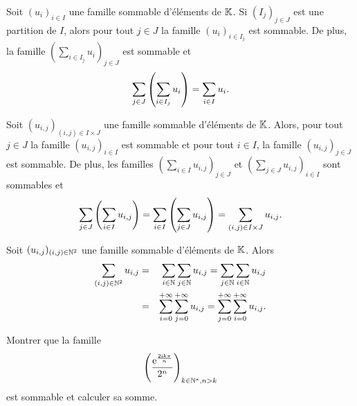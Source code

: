 \documentclass{magnolia}
\begin{document}
\begin{proposition}[nom={Théorème de sommation par paquets}]
Soit $(u_i)_{i\in I}$ une famille sommable d'éléments de $\mathbb{K}$. Si $(I_j)_{j\in J}$ est
une partition de $I$, alors pour tout $j\in J$ la famille $(u_i)_{i\in I_j}$ est
sommable. De plus, la famille $(\sum_{i\in I_j} u_i)_{j\in J}$ est sommable et
\[\sum_{j\in J} \left(\sum_{i\in I_j} u_i\right)=\sum_{i\in I} u_i.\]
\end{proposition}

\begin{proposition}[nom={Théorème de \nom{Fubini}}]
Soit $(u_{i,j})_{(i,j)\in I\times J}$ une famille sommable d'éléments de $\mathbb{K}$. Alors,
pour tout $j\in J$ la famille $(u_{i,j})_{i\in I}$ est sommable et pour tout $i\in I$,
la famille  $(u_{i,j})_{j\in J}$ est sommable. De plus, les
familles $(\sum_{i\in I} u_{i,j})_{j\in J}$ et $(\sum_{j\in J} u_{i,j})_{i\in I}$ sont
sommables et
\[\sum_{j\in J} \left(\sum_{i\in I} u_{i,j}\right)=
  \sum_{i\in I} \left(\sum_{j\in J} u_{i,j}\right)=
  \sum_{(i,j)\in I\times J} u_{i,j}.\]
\end{proposition}


\begin{remarqueUnique}
\remarque Soit $(u_{i,j})_{(i,j)\in\mathbb{N}^2}$ une famille sommable d'éléments de $\mathbb{K}$. Alors
\begin{eqnarray*}
\sum_{(i,j)\in\mathbb{N}^2} u_{i,j} &=&
  \sum_{i\in\mathbb{N}} \sum_{j\in\mathbb{N}} u_{i,j} =
  \sum_{j\in\mathbb{N}} \sum_{i\in\mathbb{N}} u_{i,j}\\
  &=& \sum_{i=0}^{+\infty} \sum_{j=0}^{+\infty} u_{i,j} =
  \sum_{j=0}^{+\infty} \sum_{i=0}^{+\infty} u_{i,j}.
\end{eqnarray*}
\end{remarqueUnique}

\begin{exoUnique}
  \exo Montrer que la famille
    \[\left(\frac{{\rm e}^{\frac{2{\rm i} k\pi}{n}}}{2^n}\right)_{k\in{\mathbb{N}^*}, n> k}\]
    est sommable et calculer sa somme.
  \end{exoUnique}
\end{document}
